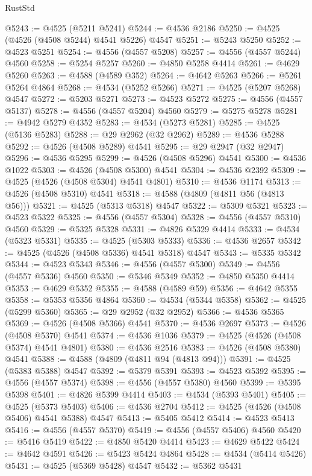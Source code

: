 \begin{lexlean}{RustStd}
\begin{coremodule}
@5243 := @4525 (@5211 @5241)
@5244 := @4536 @2186
@5250 := @4525 (@4526 (@4508 @5244) @4541 @5226) @4547
@5251 := @5243 @5250
@5252 := @4523 @5251
@5254 := @4556 (@4557 @5208)
@5257 := @4556 (@4557 @5244) @4560
@5258 := @5254 @5257
@5260 := @4850 @5258 @4414
@5261 := @4629 @5260
@5263 := @4588 (@4589 @352)
@5264 := @4642 @5263
@5266 := @5261 @5264 @4864
@5268 := @4534 (@5252 @5266)
@5271 := @4525 (@5207 @5268) @4547
@5272 := @5203 @5271
@5273 := @4523 @5272
@5275 := @4556 (@4557 @5137)
@5278 := @4556 (@4557 @5204) @4560
@5279 := @5275 @5278
@5281 := @4942 @5279 @4352
@5283 := @4534 (@5273 @5281)
@5285 := @4525 (@5136 @5283)
@5288 := @29 @2962 (@32 @2962)
@5289 := @4536 @5288
@5292 := @4526 (@4508 @5289) @4541
@5295 := @29 @2947 (@32 @2947)
@5296 := @4536 @5295
@5299 := @4526 (@4508 @5296) @4541
@5300 := @4536 @1022
@5303 := @4526 (@4508 @5300) @4541
@5304 := @4536 @2392
@5309 := @4525 (@4526 (@4508 @5304) @4541 @4801)
@5310 := @4536 @1174
@5313 := @4526 (@4508 @5310) @4541
@5318 := @4588 (@4809 (@4811 @56 (@4813 @56)))
@5321 := @4525 (@5313 @5318) @4547
@5322 := @5309 @5321
@5323 := @4523 @5322
@5325 := @4556 (@4557 @5304)
@5328 := @4556 (@4557 @5310) @4560
@5329 := @5325 @5328
@5331 := @4826 @5329 @4414
@5333 := @4534 (@5323 @5331)
@5335 := @4525 (@5303 @5333)
@5336 := @4536 @2657
@5342 := @4525 (@4526 (@4508 @5336) @4541 @5318) @4547
@5343 := @5335 @5342
@5344 := @4523 @5343
@5346 := @4556 (@4557 @5300)
@5349 := @4556 (@4557 @5336) @4560
@5350 := @5346 @5349
@5352 := @4850 @5350 @4414
@5353 := @4629 @5352
@5355 := @4588 (@4589 @59)
@5356 := @4642 @5355
@5358 := @5353 @5356 @4864
@5360 := @4534 (@5344 @5358)
@5362 := @4525 (@5299 @5360)
@5365 := @29 @2952 (@32 @2952)
@5366 := @4536 @5365
@5369 := @4526 (@4508 @5366) @4541
@5370 := @4536 @2697
@5373 := @4526 (@4508 @5370) @4541
@5374 := @4536 @1036
@5379 := @4525 (@4526 (@4508 @5374) @4541 @4801)
@5380 := @4536 @2516
@5383 := @4526 (@4508 @5380) @4541
@5388 := @4588 (@4809 (@4811 @94 (@4813 @94)))
@5391 := @4525 (@5383 @5388) @4547
@5392 := @5379 @5391
@5393 := @4523 @5392
@5395 := @4556 (@4557 @5374)
@5398 := @4556 (@4557 @5380) @4560
@5399 := @5395 @5398
@5401 := @4826 @5399 @4414
@5403 := @4534 (@5393 @5401)
@5405 := @4525 (@5373 @5403)
@5406 := @4536 @2704
@5412 := @4525 (@4526 (@4508 @5406) @4541 @5388) @4547
@5413 := @5405 @5412
@5414 := @4523 @5413
@5416 := @4556 (@4557 @5370)
@5419 := @4556 (@4557 @5406) @4560
@5420 := @5416 @5419
@5422 := @4850 @5420 @4414
@5423 := @4629 @5422
@5424 := @4642 @4591
@5426 := @5423 @5424 @4864
@5428 := @4534 (@5414 @5426)
@5431 := @4525 (@5369 @5428) @4547
@5432 := @5362 @5431

\end{coremodule}
\end{lexlean}
